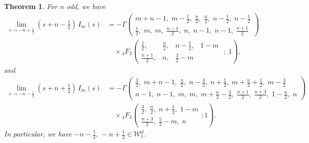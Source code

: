\documentclass{article}
\theoremstyle{boldremark}
\newtheorem{theorem}{Theorem}[section]
\renewcommand\[{\begin{equation}}
\renewcommand\]{\end{equation}}
\theoremstyle{definition}
\numberwithin{equation}{section}
\begin{document}
\begin{theorem}
    For $n$ odd, we have
    \begin{align*}
  \lim_{s\rightarrow -n+\frac{1}{2}} (s+n-\frac{1}{2})\,I_m(s) &=  - \Gamma\!\left(
\begin{matrix}
m+n-1,\; m-\frac12,\; \frac n2,\; \frac n2,\; n-\frac12,\; n-\frac12
\\[3pt]
\frac12, \; m, \; m, \; \frac{n-1}{2}, \; n, \; n-1, \; n-1, \; \frac{n+1}{2}
\end{matrix}
\right)\\[3pt]
& \quad \times {}_4F_3\left( \begin{matrix} \frac{1}{2}, & \frac{n}{2}, & n-\frac{1}{2}, & 1-m \\ \frac{n+1}{2}, & n, & \frac{3}{2}-m \end{matrix} \;;\; 1 \right),
\end{align*}
and
\begin{align*}
     \lim_{s\rightarrow -n-\frac{1}{2}} (s+n+\frac{1}{2})\,I_m(s) &=
-\Gamma\!\left(
\begin{matrix}
\frac32, \; m+n-1,\; \frac n2,\; n-\frac32,\; n+\frac12,\;
m+\frac n2+\frac12,\; m-\frac32
\\[3pt]
n-1,\; n-1,\; m,\; m,\; m+\frac n2-\frac32,\;
\frac{n+1}{2},\; \frac{n+3}{2},\; 1-\frac n2,\; n
\end{matrix}
\right)
\\[3pt]
&\quad \times
{}_4F_3 \left(
\begin{matrix}
\frac32,\; \frac n2,\; n+\frac12,\; 1-m\\[3pt]
\frac{n+3}{2},\; \frac52-m,\; n
\end{matrix};1
\right).
 \end{align*}
In particular, we have  $-n-\frac{1}{2}, \, -n+\frac{1}{2} \in \mathcal{W}^d_1$.
\end{theorem}
\end{document}

